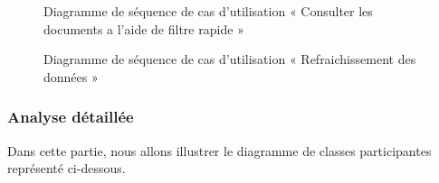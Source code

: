 \begin{figure}[H]
  \centering
  \caption{Diagramme de séquence de cas d'utilisation « Consulter les documents a l'aide de filtre rapide »}
  \label{fig:sequence_docs_quick_filter}
\end{figure}

\begin{figure}[H]
  \centering
  \caption{Diagramme de séquence de cas d'utilisation « Refraichissement des données »}
  \label{fig:sequence_refresh_data}
\end{figure}


\subsubsection{Analyse détaillée}

Dans cette partie, nous allons illustrer le diagramme de classes participantes représenté ci-dessous.

\setlength{\parskip}{1em}
\setlength{\parindent}{0em}



